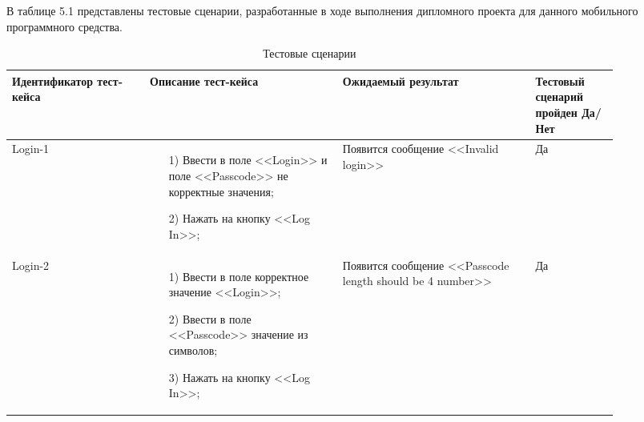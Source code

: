 В таблице 5.1 представлены тестовые сценарии, разработанные в ходе выполнения дипломного проекта для данного мобильного программного средства.
\begin{table}[ht]
  \caption{Тестовые сценарии}
  \label{table:econ:programmers}
  \begin{tabular}{| >{\raggedright}p{0.20\linewidth} 
                  | >{\raggedright}p{0.28\linewidth} 
                  | >{\raggedright}p{0.28\linewidth} 
                  | >{\raggedright\arraybackslash}p{0.12\linewidth}|}
   \hline
   Идентификатор тест-кейса & Описание тест-кейса & Ожидаемый результат & Тестовый сценарий пройден Да/Нет \\
   \hline
   Login-1 & \begin{enumerate}
				\item[1)] Ввести в поле <<Login>> и поле <<Passcode>> не корректные значения;
				\item[2)] Нажать на кнопку <<Log In>>;
			\end{enumerate}
   			 & Появится сообщение <<Invalid login>> & Да \\

   \hline
   Login-2 & \begin{enumerate}
				\item[1)] Ввести в поле корректное значение <<Login>>;
				\item[2)] Ввести в поле <<Passcode>> значение из символов;
				\item[3)] Нажать на кнопку <<Log In>>;
			\end{enumerate}
			& Появится сообщение <<Passcode length should be 4 number>> & Да \\


\end{tabular}
\end{table}
